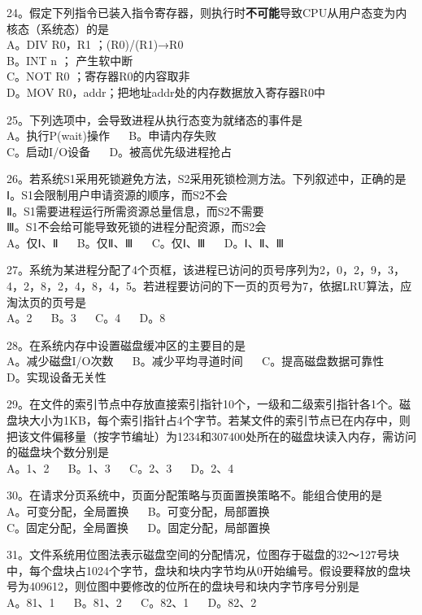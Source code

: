 24。假定下列指令已装入指令寄存器，则执行时\textbf{不可能}导致CPU从用户态变为内核态（系统态）的是 \\
A。DIV R0，R1 ；(R0)/(R1)→R0 \\
B。INT n ； 产生软中断 \\
C。NOT R0 ；寄存器R0的内容取非 \\
D。MOV R0，addr；把地址addr处的内存数据放入寄存器R0中

25。下列选项中，会导致进程从执行态变为就绪态的事件是 \\
A。执行P(wait)操作 $\quad$ B。申请内存失败 \\
C。启动I/O设备 $\quad$ D。被高优先级进程抢占

26。若系统S1采用死锁避免方法，S2采用死锁检测方法。下列叙述中，正确的是 \\
Ⅰ。S1会限制用户申请资源的顺序，而S2不会 \\
Ⅱ。S1需要进程运行所需资源总量信息，而S2不需要 \\
Ⅲ。S1不会给可能导致死锁的进程分配资源，而S2会 \\
A。仅Ⅰ、Ⅱ $\quad$ B。仅Ⅱ、Ⅲ $\quad$ C。仅Ⅰ、Ⅲ $\quad$ D。Ⅰ、Ⅱ、Ⅲ

27。系统为某进程分配了4个页框，该进程已访问的页号序列为2，0，2，9，3，4，2，8，2，4，8，4，5。若进程要访问的下一页的页号为7，依据LRU算法，应淘汰页的页号是 \\
A。2 $\quad$ B。3 $\quad$ C。4 $\quad$ D。8

28。在系统内存中设置磁盘缓冲区的主要目的是 \\
A。减少磁盘I/O次数 $\quad$ B。减少平均寻道时间 $\quad$ C。提高磁盘数据可靠性 $\quad$ D。实现设备无关性

29。在文件的索引节点中存放直接索引指针10个，一级和二级索引指针各1个。磁盘块大小为1KB，每个索引指针占4个字节。若某文件的索引节点已在内存中，则把该文件偏移量（按字节编址）为1234和307400处所在的磁盘块读入内存，需访问的磁盘块个数分别是 \\
A。1、2 $\quad$ B。1、3 $\quad$ C。2、3 $\quad$ D。2、4

30。在请求分页系统中，页面分配策略与页面置换策略不。能组合使用的是 \\
A。可变分配，全局置换 $\quad$ B。可变分配，局部置换 \\
C。固定分配，全局置换 $\quad$ D。固定分配，局部置换

31。文件系统用位图法表示磁盘空间的分配情况，位图存于磁盘的32～127号块中，每个盘块占1024个字节，盘块和块内字节均从0开始编号。假设要释放的盘块号为409612，则位图中要修改的位所在的盘块号和块内字节序号分别是 \\
A。81、1 $\quad$ B。81、2 $\quad$ C。82、1 $\quad$ D。82、2

